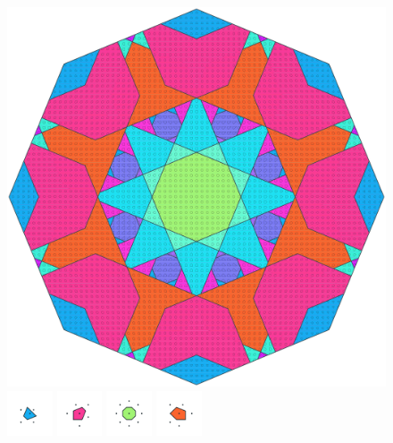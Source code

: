 \documentclass[text.tex]{subfiles}
\begin{document}
\clearpage
\pagestyle{fancy}
\fancyhf{}
\begin{figure}[h!]
\centering
\includegraphics[width=1\textwidth]{img/results/octagon/octagon_131066_(-2_3alpha_4).pdf}
\includegraphics[width=0.12\textwidth]{img/results/octagon/octagon_131066_(-2_3alpha_4)_001.pdf}
\includegraphics[width=0.12\textwidth]{img/results/octagon/octagon_131066_(-2_3alpha_4)_002.pdf}
\includegraphics[width=0.12\textwidth]{img/results/octagon/octagon_131066_(-2_3alpha_4)_003.pdf}
\includegraphics[width=0.12\textwidth]{img/results/octagon/octagon_131066_(-2_3alpha_4)_004.pdf}

\end{figure}
\end{document}

